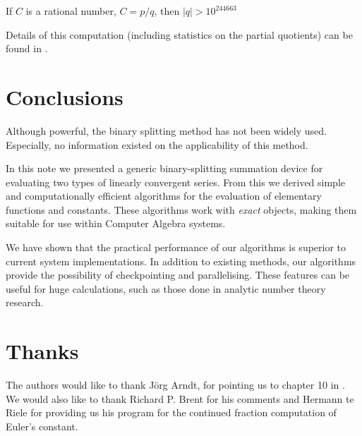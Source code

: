 \medskip

\centerline{If \( C \) is a rational number, \(C=p/q\), then \( |q| > 10^{244663} \)}

\medskip

Details of this computation (including statistics on the partial 
quotients) can be found in \cite{98}.


\section{Conclusions}

Although powerful, the binary splitting method has not been widely used.
Especially, no information existed on the applicability of this method.

In this note we presented a generic binary-splitting summation device for
evaluating two types of linearly convergent series. From this we derived simple
and computationally efficient algorithms for the evaluation of elementary
functions and constants. These algorithms work with {\em exact}
objects, making them suitable for use within Computer Algebra systems.

We have shown that the practical performance of our algorithms is
superior to current system implementations. In addition to existing methods,
our algorithms provide the possibility of checkpointing and parallelising.
These features can be useful for huge calculations, such as those done in
analytic number theory research.

\section{Thanks}

The authors would like to thank J\"org Arndt, for pointing us to
chapter 10 in \cite{87}. We would also like to thank Richard P. Brent for 
his comments and Hermann te Riele for providing us his program for the
continued fraction computation of Euler's constant.





